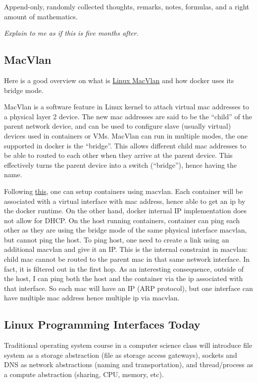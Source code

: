 



Append-only, randomly collected thoughts, remarks, notes, formulas, and
a right amount of mathematics.

\begin{flushright}
    \textit{
Explain to me as if this is five months after.
    }
\end{flushright}

\notesep
\subsection*{MacVlan}
Here is a good overview on what is
\href{https://hicu.be/bridge-vs-macvlan}{Linux MacVlan} and how docker uses
its bridge mode.

MacVlan is a software feature in Linux kernel to attach virtual mac addresses
to a physical layer 2 device. The new mac addresses are said to be the
``child'' of the parent network device, and can be used to configure slave
(usually virtual) devices used in containers or VMs. MacVlan can run in
multiple modes, the one supported in docker is the ``bridge''. This allows
different child mac addresses to be able to routed to each other when they
arrive at the parent device. This effectively turns the parent device into a
switch (``bridge''), hence having the name.

Following
\href{https://hicu.be/docker-networking-macvlan-vlan-configuration}{this},
one can setup containers using macvlan. Each container will be associated
with a virtual interface with mac address, hence able to get an ip by the
docker runtime. On the other hand, docker internal IP implementation does not
allow for DHCP. On the host running containers, container can ping each other
as they are using the bridge mode of the same physical interface macvlan, but
cannot ping the host. To ping host, one need to create a link using an
additional macvlan and give it an IP. This is the internal constraint in
macvlan: child mac cannot be routed to the parent mac in that same network
interface. In fact, it is filtered out in the first hop. As an interesting
consequence, outside of the host, I can ping both the host and the container
via the ip associated with that interface. So each mac will have an IP (ARP
protocol), but one interface can have multiple mac address hence multiple ip
via macvlan.

\subsection*{Linux Programming Interfaces Today}
Traditional operating system course in a computer science class will introduce
file system as a storage abstraction (file as storage access gateways), sockets
and DNS as network abstractions (naming and transportation), and thread/process
as a compute abstraction (sharing, CPU, memory, etc).

